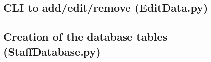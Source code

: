 \begin{landscape}
\newpage
\subsection{CLI to add/edit/remove (EditData.py)}\label{EditData}

\newpage
\subsection{Creation of the database tables (StaffDatabase.py)}\label{SDB}

\end{landscape}
